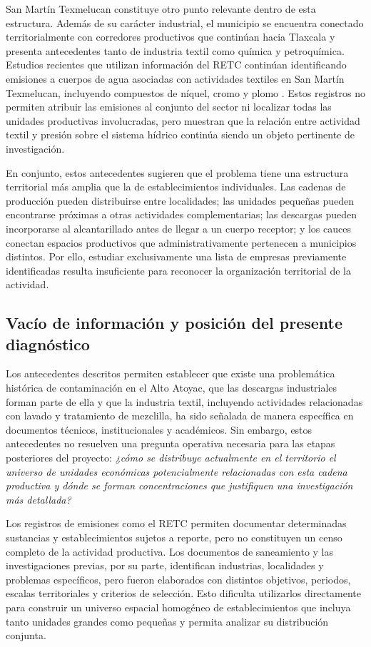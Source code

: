 \documentclass[11pt,letterpaper]{article}
\begin{document}
San Martín Texmelucan constituye otro punto relevante dentro de esta estructura. Además de su carácter industrial, el municipio se encuentra conectado territorialmente con corredores productivos que continúan hacia Tlaxcala y presenta antecedentes tanto de industria textil como química y petroquímica. Estudios recientes que utilizan información del RETC continúan identificando emisiones a cuerpos de agua asociadas con actividades textiles en San Martín Texmelucan, incluyendo compuestos de níquel, cromo y plomo \cite{percepcionriesgo2025}. Estos registros no permiten atribuir las emisiones al conjunto del sector ni localizar todas las unidades productivas involucradas, pero muestran que la relación entre actividad textil y presión sobre el sistema hídrico continúa siendo un objeto pertinente de investigación.

En conjunto, estos antecedentes sugieren que el problema tiene una estructura territorial más amplia que la de establecimientos individuales. Las cadenas de producción pueden distribuirse entre localidades; las unidades pequeñas pueden encontrarse próximas a otras actividades complementarias; las descargas pueden incorporarse al alcantarillado antes de llegar a un cuerpo receptor; y los cauces conectan espacios productivos que administrativamente pertenecen a municipios distintos. Por ello, estudiar exclusivamente una lista de empresas previamente identificadas resulta insuficiente para reconocer la organización territorial de la actividad.

\subsection{Vacío de información y posición del presente diagnóstico}

Los antecedentes descritos permiten establecer que existe una problemática histórica de contaminación en el Alto Atoyac, que las descargas industriales forman parte de ella y que la industria textil, incluyendo actividades relacionadas con lavado y tratamiento de mezclilla, ha sido señalada de manera específica en documentos técnicos, institucionales y académicos. Sin embargo, estos antecedentes no resuelven una pregunta operativa necesaria para las etapas posteriores del proyecto: \textit{¿cómo se distribuye actualmente en el territorio el universo de unidades económicas potencialmente relacionadas con esta cadena productiva y dónde se forman concentraciones que justifiquen una investigación más detallada?}

Los registros de emisiones como el RETC permiten documentar determinadas sustancias y establecimientos sujetos a reporte, pero no constituyen un censo completo de la actividad productiva. Los documentos de saneamiento y las investigaciones previas, por su parte, identifican industrias, localidades y problemas específicos, pero fueron elaborados con distintos objetivos, periodos, escalas territoriales y criterios de selección. Esto dificulta utilizarlos directamente para construir un universo espacial homogéneo de establecimientos que incluya tanto unidades grandes como pequeñas y permita analizar su distribución conjunta.
\end{document}
